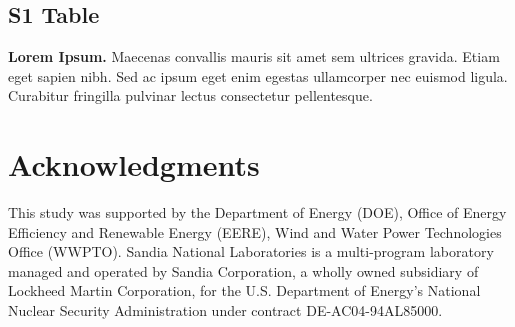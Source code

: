 \documentclass[10pt,letterpaper]{article}
\begin{document}
\subsection*{S1 Table}
\label{S1_Table}
{\bf Lorem Ipsum.} Maecenas convallis mauris sit amet sem ultrices gravida.
Etiam eget sapien nibh. Sed ac ipsum eget enim egestas ullamcorper nec euismod
ligula. Curabitur fringilla pulvinar lectus consectetur pellentesque.

\section*{Acknowledgments}

This study was supported by the Department of Energy (DOE), Office of Energy
Efficiency and Renewable Energy (EERE), Wind and Water Power Technologies Office
(WWPTO). Sandia National Laboratories is a multi-program laboratory managed and
operated by Sandia Corporation, a wholly owned subsidiary of Lockheed Martin
Corporation, for the U.S. Department of Energy's National Nuclear Security
Administration under contract DE-AC04-94AL85000.

\nolinenumbers

% 

\end{document}
